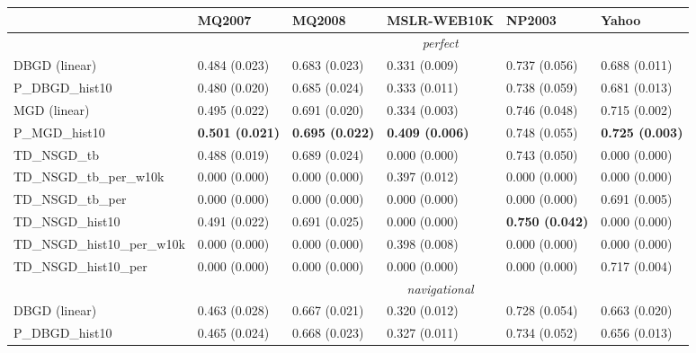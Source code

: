 \begin{tabular*}{\textwidth}{@{\extracolsep{\fill} } l  l l l l l  }
\toprule
 & { \small \textbf{MQ2007}}  & { \small \textbf{MQ2008}}  & { \small \textbf{MSLR-WEB10K}}  & { \small \textbf{NP2003}}  & { \small \textbf{Yahoo}} \\
\midrule
& \multicolumn{5}{|c|}{\textit{perfect}} \\
\midrule
DBGD (linear) & 0.484 {\tiny (0.023)} & 0.683 {\tiny (0.023)} & 0.331 {\tiny (0.009)} & 0.737 {\tiny (0.056)} & 0.688 {\tiny (0.011)} \\
P\_DBGD\_hist10 & 0.480 {\tiny (0.020)} & 0.685 {\tiny (0.024)} & 0.333 {\tiny (0.011)} & 0.738 {\tiny (0.059)} & 0.681 {\tiny (0.013)} \\
MGD (linear) & 0.495 {\tiny (0.022)} & 0.691 {\tiny (0.020)} & 0.334 {\tiny (0.003)} & 0.746 {\tiny (0.048)} & 0.715 {\tiny (0.002)} \\
P\_MGD\_hist10 & \bf 0.501 {\tiny (0.021)} & \bf 0.695 {\tiny (0.022)} & \bf 0.409 {\tiny (0.006)} & 0.748 {\tiny (0.055)} & \bf 0.725 {\tiny (0.003)} \\
TD\_NSGD\_tb & 0.488 {\tiny (0.019)} & 0.689 {\tiny (0.024)} & 0.000 {\tiny (0.000)} & 0.743 {\tiny (0.050)} & 0.000 {\tiny (0.000)} \\
TD\_NSGD\_tb\_per\_w10k & 0.000 {\tiny (0.000)} & 0.000 {\tiny (0.000)} & 0.397 {\tiny (0.012)} & 0.000 {\tiny (0.000)} & 0.000 {\tiny (0.000)} \\
TD\_NSGD\_tb\_per & 0.000 {\tiny (0.000)} & 0.000 {\tiny (0.000)} & 0.000 {\tiny (0.000)} & 0.000 {\tiny (0.000)} & 0.691 {\tiny (0.005)} \\
TD\_NSGD\_hist10 & 0.491 {\tiny (0.022)} & 0.691 {\tiny (0.025)} & 0.000 {\tiny (0.000)} & \bf 0.750 {\tiny (0.042)} & 0.000 {\tiny (0.000)} \\
TD\_NSGD\_hist10\_per\_w10k & 0.000 {\tiny (0.000)} & 0.000 {\tiny (0.000)} & 0.398 {\tiny (0.008)} & 0.000 {\tiny (0.000)} & 0.000 {\tiny (0.000)} \\
TD\_NSGD\_hist10\_per & 0.000 {\tiny (0.000)} & 0.000 {\tiny (0.000)} & 0.000 {\tiny (0.000)} & 0.000 {\tiny (0.000)} & 0.717 {\tiny (0.004)} \\
\midrule
& \multicolumn{5}{|c|}{\textit{navigational}} \\
\midrule
DBGD (linear) & 0.463 {\tiny (0.028)} & 0.667 {\tiny (0.021)} & 0.320 {\tiny (0.012)} & 0.728 {\tiny (0.054)} & 0.663 {\tiny (0.020)} \\
P\_DBGD\_hist10 & 0.465 {\tiny (0.024)} & 0.668 {\tiny (0.023)} & 0.327 {\tiny (0.011)} & 0.734 {\tiny (0.052)} & 0.656 {\tiny (0.013)} \\

\end{tabular*}
